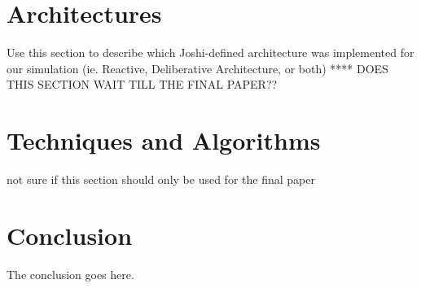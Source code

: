 \documentclass[journal, 10pt]{IEEEtran}
\begin{document}
\clearpage

\section{Architectures}
Use this section to describe which Joshi-defined architecture was implemented for our simulation (ie. Reactive, Deliberative Architecture, or both)
**** DOES THIS SECTION WAIT TILL THE FINAL PAPER??

\section{Techniques and Algorithms}
not sure if this section should only be used for the final paper


\section{Conclusion}
The conclusion goes here.


\nocite{*}

{}
\end{document}
